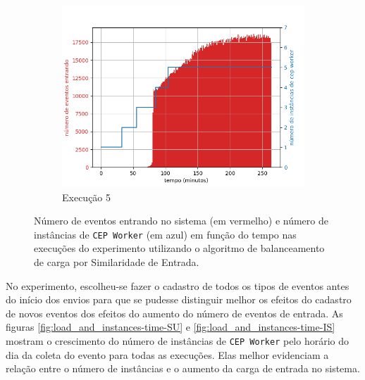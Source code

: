 \begin{figure}[h!]
\begin{subfigure}{.5\textwidth}
  \includegraphics[width=\linewidth]{figuras/graphics/carga_e_workers_total10-dez-is.png}  
  \caption{Execução 5}
  \label{fig:cewt-10-dez-is}
\end{subfigure}
\caption{Número de eventos entrando no sistema (em vermelho) e número de instâncias de \texttt{CEP Worker} (em azul) em função do tempo nas execuções do experimento utilizando o algoritmo de balanceamento de carga por Similaridade de Entrada.}
\label{fig:workers_and_events_IS}
\end{figure}
 
No experimento, escolheu-se fazer o cadastro de todos os tipos de eventos antes do início dos envios para que se pudesse distinguir melhor os efeitos do cadastro de novos eventos dos efeitos do aumento do número de eventos de entrada. As figuras \ref{fig:load_and_instances-time-SU}  e \ref{fig:load_and_instances-time-IS} mostram o crescimento do número de instâncias de \texttt{CEP Worker} pelo horário do dia da coleta do evento para todas as execuções. Elas melhor evidenciam a relação entre o número de instâncias e o aumento da carga de entrada no sistema.


